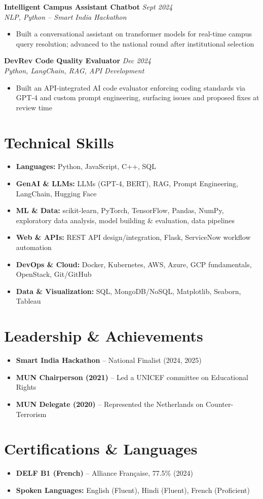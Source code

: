 \documentclass[10.5pt,a4paper]{article}
\newcommand{\entry}[4]{%
  \textbf{#1} \hfill \textit{#2}\\
  \textit{#3} \hfill #4\\[2pt]
}
\begin{document}
\entry{Intelligent Campus Assistant Chatbot}{Sept 2024}{NLP, Python -- Smart India Hackathon}{}
\begin{itemize}
  \item Built a conversational assistant on transformer models for real-time campus query resolution; advanced to the national round after institutional selection
\end{itemize}

\entry{DevRev Code Quality Evaluator}{Dec 2024}{Python, LangChain, RAG, API Development}{}
\begin{itemize}
  \item Built an API-integrated AI code evaluator enforcing coding standards via GPT-4 and custom prompt engineering, surfacing issues and proposed fixes at review time
\end{itemize}

\section*{Technical Skills}
\begin{itemize}[leftmargin=1.1em]
  \item \textbf{Languages:} Python, JavaScript, C++, SQL
  \item \textbf{GenAI \& LLMs:} LLMs (GPT-4, BERT), RAG, Prompt Engineering, LangChain, Hugging Face
  \item \textbf{ML \& Data:} scikit-learn, PyTorch, TensorFlow, Pandas, NumPy, exploratory data analysis, model building \& evaluation, data pipelines
  \item \textbf{Web \& APIs:} REST API design/integration, Flask, ServiceNow workflow automation
  \item \textbf{DevOps \& Cloud:} Docker, Kubernetes, AWS, Azure, GCP fundamentals, OpenStack, Git/GitHub
  \item \textbf{Data \& Visualization:} SQL, MongoDB/NoSQL, Matplotlib, Seaborn, Tableau
\end{itemize}

\section*{Leadership \& Achievements}
\begin{itemize}
  \item \textbf{Smart India Hackathon} -- National Finalist (2024, 2025)
  \item \textbf{MUN Chairperson (2021)} -- Led a UNICEF committee on Educational Rights
  \item \textbf{MUN Delegate (2020)} -- Represented the Netherlands on Counter-Terrorism
\end{itemize}

\section*{Certifications \& Languages}
\begin{itemize}
  \item \textbf{DELF B1 (French)} -- Alliance Française, 77.5\% (2024)
  \item \textbf{Spoken Languages:} English (Fluent), Hindi (Fluent), French (Proficient)
\end{itemize}
\end{document}
